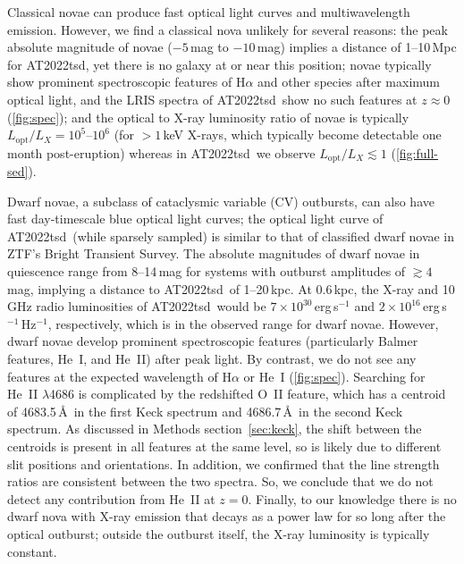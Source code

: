 \documentclass{nature_plusfigure}
\newcommand{\at}{AT2022tsd}
\begin{document}
\begin{methods}
Classical novae can produce fast optical light curves and multiwavelength emission\cite{Chomiuk2021}. However, we find a classical nova unlikely for several reasons: the peak absolute magnitude of novae ($-5\,$mag to $-10\,$mag\cite{Chomiuk2021}) implies a distance of 1--10\,Mpc for \at, yet there is no galaxy at or near this position; novae typically show prominent spectroscopic features of H$\alpha$ and other species after maximum optical light\cite{Chomiuk2021}, and the LRIS spectra of \at\ show no such features at $z\approx0$ (\ref{fig:spec}); and the optical to X-ray luminosity ratio of novae is typically $L_\mathrm{opt}/L_X=10^{5}$--$10^{6}$ (for $>1\,$keV X-rays, which typically become detectable one month post-eruption\cite{Chomiuk2021}) whereas in \at\ we observe $L_\mathrm{opt}/L_X\lesssim1$ (\ref{fig:full-sed}).

Dwarf novae, a subclass of cataclysmic variable (CV) outbursts, can also have fast day-timescale blue optical light curves; the optical light curve of \at\ (while sparsely sampled) is similar to that of classified dwarf novae in ZTF's Bright Transient Survey\cite{PerleyBTS}. The absolute magnitudes of dwarf novae in quiescence range from 8--14\,mag for systems with outburst amplitudes of $\gtrsim4\,$mag\cite{Szkody2021}, implying a distance to \at\ of 1--20\,kpc. At 0.6\,kpc, the X-ray and 10\,GHz radio luminosities of \at\ would be $7\times10^{30}\,$erg\,s$^{-1}$ and $2\times10^{16}$\,erg\,s$^{-1}$\,Hz$^{-1}$, respectively, which is in the observed range for dwarf novae\cite{Polzin2022,Coppejans2020_CV}. 
However, dwarf novae develop prominent spectroscopic features (particularly Balmer features, He~I, and He~II) after peak light\cite{Morales-Rueda2002,Han2020}. By contrast, we do not see any features at the expected wavelength of H$\alpha$ or He~I (\ref{fig:spec}). Searching for He~II $\lambda$4686 is complicated by the redshifted O~II feature, which has a centroid of 4683.5\,\AA\ in the first Keck spectrum and 4686.7\,\AA\ in the second Keck spectrum. 
As discussed in Methods section~\ref{sec:keck}, the shift between the centroids is present in all features at the same level, so is likely due to different slit positions and orientations. In addition, we confirmed that the line strength ratios are consistent between the two spectra. So, we conclude that we do not detect any contribution from He~II at $z=0$.
Finally, to our knowledge there is no dwarf nova with X-ray emission that decays as a power law for so long after the optical outburst; outside the outburst itself, the X-ray luminosity is typically constant\cite{Fertig2011}.


\end{methods}
\end{document}
